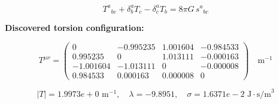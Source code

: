 
\begin{equation}
  T^a{}_{bc} + \delta^a_b T_c - \delta^a_c T_b = 8\pi G \, s^a{}_{bc}
\end{equation}

\textbf{Discovered torsion configuration:}

\begin{equation}
  T^{\mu\nu} = \begin{pmatrix}
    0 & -0.995235 & 1.001604 & -0.984533 \\
    0.995235 & 0 & 1.013111 & -0.000163 \\
    -1.001604 & -1.013111 & 0 & -0.000008 \\
    0.984533 & 0.000163 & 0.000008 & 0
  \end{pmatrix} \quad \text{m}^{-1}
\end{equation}

\begin{equation}
  |T| = 1.9973e+0 \text{ m}^{-1}, \quad
  \lambda = -9.8951, \quad
  \sigma = 1.6371e-2 \text{ J}\cdot\text{s/m}^3
\end{equation}